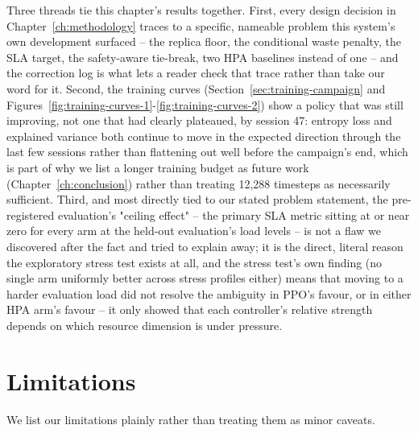 Three threads tie this chapter's results together. First, every design
decision in Chapter~\ref{ch:methodology} traces to a specific, nameable
problem this system's own development surfaced -- the replica floor, the
conditional waste penalty, the SLA target, the safety-aware tie-break, two
HPA baselines instead of one -- and the correction log is what lets a
reader check that trace rather than take our word for it. Second, the
training curves (Section~\ref{sec:training-campaign} and
Figures~\ref{fig:training-curves-1}-\ref{fig:training-curves-2}) show a
policy that was still improving, not one that had clearly plateaued, by
session 47: entropy loss and explained variance both continue to move in
the expected direction through the last few sessions rather than
flattening out well before the campaign's end, which is part of why we
list a longer training budget as future work (Chapter~\ref{ch:conclusion})
rather than treating 12,288 timesteps as necessarily sufficient. Third, and
most directly tied to our stated problem statement, the pre-registered
evaluation's "ceiling effect" -- the primary SLA metric sitting at or near
zero for every arm at the held-out evaluation's load levels -- is not a
flaw we discovered after the fact and tried to explain away; it is the
direct, literal reason the exploratory stress test exists at all, and the
stress test's own finding (no single arm uniformly better across stress
profiles either) means that moving to a harder evaluation load did not
resolve the ambiguity in PPO's favour, or in either HPA arm's favour -- it
only showed that each controller's relative strength depends on which
resource dimension is under pressure.

\section{Limitations}
\label{sec:limitations}

We list our limitations plainly rather than treating them as minor
caveats.

